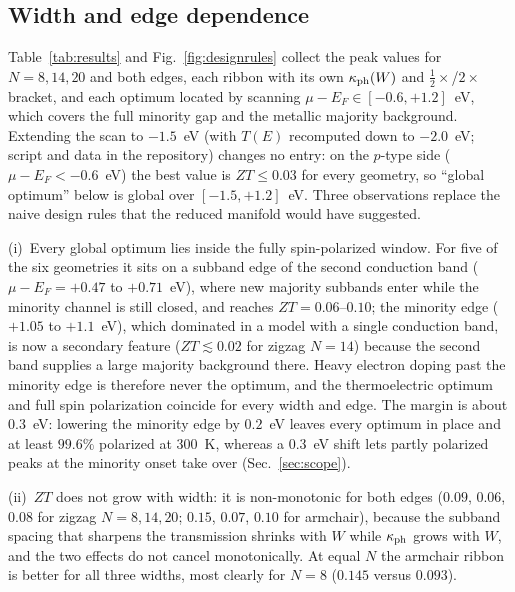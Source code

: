 \documentclass[preprint,12pt]{elsarticle}
\begin{document}
\subsection{Width and edge dependence}
\label{sec:widths}
Table~\ref{tab:results} and Fig.~\ref{fig:designrules} collect the peak values for
$N=8,14,20$ and both edges, each ribbon with its own $\kappa_{\rm ph}(W)$ and
$\tfrac12\times$/$2\times$ bracket, and each optimum located by scanning
$\mu-E_F\in[-0.6,+1.2]$~eV, which covers the full minority gap and the metallic majority
background. Extending the scan to $-1.5$~eV (with $T(E)$ recomputed down to $-2.0$~eV; script
and data in the repository) changes no entry: on the $p$-type side ($\mu-E_F<-0.6$~eV) the
best value is $ZT\le0.03$ for every geometry, so ``global optimum'' below is global over
$[-1.5,+1.2]$~eV. Three observations replace the naive design rules that the reduced manifold would have
suggested.

(i)~Every global optimum lies inside the fully spin-polarized window. For five of the six
geometries it sits on a subband edge of the second conduction band ($\mu-E_F=+0.47$ to
$+0.71$~eV), where new majority subbands enter while the minority channel is still closed,
and reaches $ZT=0.06$--$0.10$; the minority edge ($+1.05$ to $+1.1$~eV), which dominated in a
model with a single conduction band, is now a secondary feature ($ZT\lesssim0.02$ for zigzag
$N=14$) because the second band supplies a large majority background there. Heavy electron
doping past the minority edge is therefore never the optimum, and the thermoelectric optimum
and full spin polarization coincide for every width and edge. The margin is about $0.3$~eV:
lowering the minority edge by $0.2$~eV leaves every optimum in place and at least $99.6\%$
polarized at $300$~K, whereas a $0.3$~eV shift lets partly polarized peaks at the minority
onset take over (Sec.~\ref{sec:scope}).

(ii)~$ZT$ does not grow with width: it is non-monotonic for both edges ($0.09$, $0.06$, $0.08$
for zigzag $N=8,14,20$; $0.15$, $0.07$, $0.10$ for armchair), because the subband spacing that
sharpens the transmission shrinks with $W$ while $\kappa_{\rm ph}$ grows with $W$, and the
two effects do not cancel monotonically. At equal $N$ the armchair ribbon is better for all
three widths, most clearly for $N=8$ ($0.145$ versus $0.093$).
\end{document}
